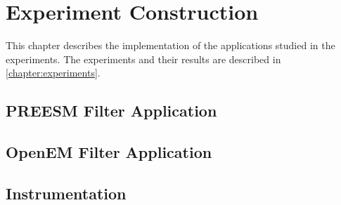 \chapter{Experiment Construction}
\label{chapter:construction}
This chapter describes the implementation of the applications studied in the experiments. The experiments and their results are described in \ref{chapter:experiments}. 

\section{PREESM Filter Application}
\label{sec:preesmapp}


\section{OpenEM Filter Application}
\label{sec:oemapp}


\section{Instrumentation}
\label{sec:instrumentation}

